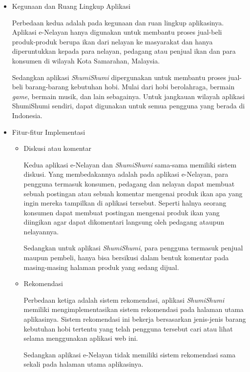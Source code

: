 \documentclass[a4paper]{article}
\begin{document}
\begin{itemize}
\begin{enumerate}
\begin{itemize}
            \item Kegunaan dan Ruang Lingkup Aplikasi
    
            Perbedaan kedua adalah pada kegunaan dan ruan lingkup aplikasinya. Aplikasi e-Nelayan hanya digunakan untuk membantu proses jual-beli produk-produk berupa ikan dari nelayan ke masyarakat dan hanya diperuntukkan kepada para nelayan, pedagang atau penjual ikan dan para konsumen di wilayah Kota Samarahan, Malaysia\autocite[1-10]{fishes-marketplace}.
    
            Sedangkan aplikasi \textit{ShumiShumi} dipergunakan untuk membantu proses jual-beli barang-barang kebutuhan hobi. Mulai dari hobi berolahraga, bermain \textit{game}, bermain musik, dan lain sebagainya. Untuk jangkauan wilayah aplikasi ShumiShumi sendiri, dapat digunakan untuk semua pengguna yang berada di Indonesia.
    
            \item Fitur-fitur Implementasi
    
            \begin{itemize}
                \item Diskusi atau komentar
    
                Kedua aplikasi e-Nelayan dan \textit{ShumiShumi} sama-sama memiliki sistem diskusi. Yang membedakannya adalah pada aplikasi e-Nelayan, para pengguna termasuk konsumen, pedagang dan nelayan dapat membuat sebuah postingan atau sebuah komentar mengenai produk ikan apa yang ingin mereka tampilkan di aplikasi tersebut. Seperti halnya seorang konsumen dapat membuat postingan mengenai produk ikan yang diingikan agar dapat dikomentari langsung oleh pedagang ataupun nelayannya\autocite[1-10]{fishes-marketplace}.
    
                Sedangkan untuk aplikasi \textit{ShumiShumi}, para pengguna termasuk penjual maupun pembeli, hanya bisa bersikusi dalam bentuk komentar pada masing-masing halaman produk yang sedang dijual.
    
                \item Rekomendasi
    
                Perbedaan ketiga adalah sistem rekomendasi, aplikasi \textit{ShumiShumi} memiliki mengimplementasikan sistem rekomendasi pada halaman utama aplikasinya. Sistem rekomendasi ini bekerja bersasarkan jenis-jenis barang kebutuhan hobi tertentu yang telah pengguna tersebut cari atau lihat selama menggunakan aplikasi web ini.
    
                Sedangkan aplikasi e-Nelayan tidak memiliki sistem rekomendasi sama sekali pada halaman utama aplikasinya\autocite[1-10]{fishes-marketplace}.
    

\end{itemize}
\end{itemize}
\end{enumerate}
\end{itemize}
\end{document}
